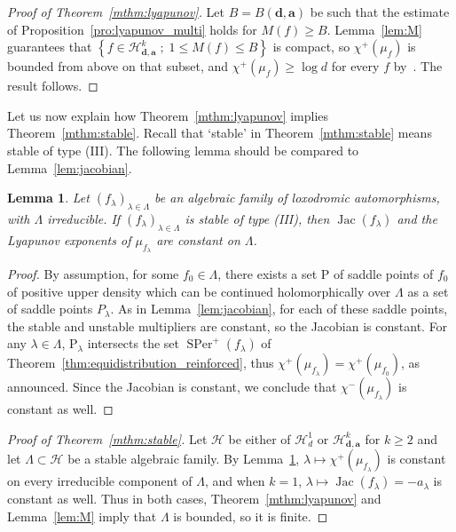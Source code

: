 \documentclass[oneside, 12pt]{amsart}
\newcommand{\set}[1]{\left\{#1\right\}}
\DeclareMathOperator{\jac}{Jac}
\DeclareMathOperator{\SPer}{SPer}
\theoremstyle{plain}
\newtheorem{lem}[thm]{Lemma}
\theoremstyle{definition}
\numberwithin{equation}{section}       %
\numberwithin{equation}{section}       %
\begin{document}
\begin{proof}[Proof of Theorem~\ref{mthm:lyapunov}]  
Let $B = B(\mathbf d, \mathbf a)$ be such that the estimate of Proposition~\ref{pro:lyapunov_multi} holds for 
$M(f)\geq B$.  
Lemma~\ref{lem:M} guarantees that  $\set{f\in \mathcal H^k_{\mathbf d, \mathbf a}\; ; \;  1\leq M(f)\leq B}$  
is compact, so  $\chi^+(\mu_f)$ is   bounded from above  on that subset, and 
$\chi^+(\mu_f)\geq \log d$ for every $f$ by~\cite{bs3}. 
The result follows. 
\end{proof}



Let us now  explain how Theorem~\ref{mthm:lyapunov} implies 
   Theorem~\ref{mthm:stable}. 
Recall that `stable' in Theorem~\ref{mthm:stable} means stable of type (III). 
The following lemma should be compared to Lemma~\ref{lem:jacobian}. 

\begin{lem}\label{lem:jacobian2}
Let $(f_\lambda)_{\lambda\in \Lambda}$ be an  algebraic family  of loxodromic automorphisms, with $\Lambda$ irreducible. If $(f_\lambda)_{\lambda\in \Lambda}$ is stable of type (III),
 then  $\jac(f_\lambda)$ and the Lyapunov exponents of $\mu_{f_\lambda}$ are   constant on $\Lambda$.
\end{lem}

\begin{proof}
By assumption, for some $f_0\in \Lambda$, there exists a set $\mathrm P$ of saddle points of $f_0$
of positive upper density 
which can be continued holomorphically over $\Lambda$ as a set of saddle points $P_\lambda$. As in Lemma~\ref{lem:jacobian}, for each of these saddle points, the stable and unstable multipliers are constant,
 so the Jacobian is constant. For any $\lambda\in \Lambda$, $\mathrm P_\lambda$ 
intersects the set $\SPer^+(f_\lambda)$ of Theorem~\ref{thm:equidistribution_reinforced}, thus  $\chi^+(\mu_{f_\lambda}) = \chi^+(\mu_{f_0})$, as announced. Since the Jacobian is constant, we conclude that  $\chi^-(\mu_{f_\lambda})$ is  constant as well.
\end{proof}

\begin{proof}[Proof of Theorem~\ref{mthm:stable}]
Let $\mathcal H$ be either of $\mathcal H^1_d$ or $\mathcal H^k_{\mathbf d,\mathbf a}$ for $k\geq 2$ and let $\Lambda\subset \mathcal H$ be a stable algebraic family.
By Lemma~\ref{lem:jacobian2}, $\lambda \mapsto \chi^+(\mu_{f_\lambda}) $ is constant on every irreducible component of $\Lambda$, 
and when
$k = 1$, $\lambda\mapsto \jac(f_\lambda)  = -a_\lambda$ is   constant as well. 
Thus in both cases, Theorem~\ref{mthm:lyapunov} and Lemma~\ref{lem:M} imply that 
$\Lambda$ is bounded, so it is finite.
\end{proof}
\end{document}
